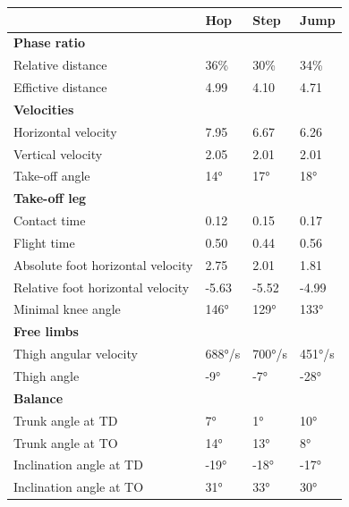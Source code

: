 \documentclass[]{scrreprt}
\begin{document}
\begin{table}[H]
\centering
\begin{tabular}{l|l|l|l}
\hline
  & Hop & Step & Jump\\
\hline
\multicolumn{4}{l}{\textbf{Phase ratio}}\\
\hline
\hspace{1em}Relative distance & 36\% & 30\% & 34\%\\
\hline
\hspace{1em}Effictive distance & 4.99 & 4.10 & 4.71\\
\hline
\multicolumn{4}{l}{\textbf{Velocities}}\\
\hline
\hspace{1em}Horizontal velocity & 7.95 & 6.67 & 6.26\\
\hline
\hspace{1em}Vertical velocity & 2.05 & 2.01 & 2.01\\
\hline
\hspace{1em}Take-off angle & 14° & 17° & 18°\\
\hline
\multicolumn{4}{l}{\textbf{Take-off leg}}\\
\hline
\hspace{1em}Contact time & 0.12 & 0.15 & 0.17\\
\hline
\hspace{1em}Flight time & 0.50 & 0.44 & 0.56\\
\hline
\hspace{1em}Absolute foot horizontal velocity & 2.75 & 2.01 & 1.81\\
\hline
\hspace{1em}Relative foot horizontal velocity & -5.63 & -5.52 & -4.99\\
\hline
\hspace{1em}Minimal knee angle & 146° & 129° & 133°\\
\hline
\multicolumn{4}{l}{\textbf{Free limbs}}\\
\hline
\hspace{1em}Thigh angular velocity & 688°/s & 700°/s & 451°/s\\
\hline
\hspace{1em}Thigh angle & -9° & -7° & -28°\\
\hline
\multicolumn{4}{l}{\textbf{Balance}}\\
\hline
\hspace{1em}Trunk angle at TD & 7° & 1° & 10°\\
\hline
\hspace{1em}Trunk angle at TO & 14° & 13° & 8°\\
\hline
\hspace{1em}Inclination angle at TD & -19° & -18° & -17°\\
\hline
\hspace{1em}Inclination angle at TO & 31° & 33° & 30°\\
\hline
\end{tabular}
\end{table}
\end{document}
